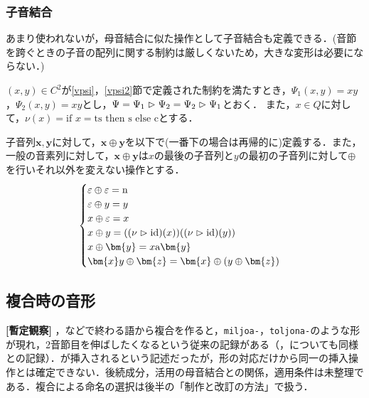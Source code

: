\documentclass[../../main-detail.tex]{subfiles}
\begin{document}
\subsubsection{子音結合}
あまり使われないが，母音結合に似た操作として子音結合も定義できる．(音節を跨ぐときの子音の配列に関する制約は厳しくないため，大きな変形は必要にならない．)
\begin{definition}
  $(x,y)\in C^2$が\ref{vpsi}，\ref{vpsi2}節で定義された制約を満たすとき，$\Psi_1(x,y)=xy$，$\Psi_2(x,y)=xy$とし，$\Psi = \Psi_1\vartriangleright \Psi_2 = \Psi_2\vartriangleright \Psi_1$とおく．%
  また，$x\in Q$に対して，$\nu(x)=\text{if }x=\text{ts}\text{ then }\text{s}\text{ else }\text{c}$とする．
\end{definition}
\begin{definition}
子音列$\bm{x},\bm{y}$に対して，$\bm{x}\oplus \bm{y}$を以下で(一番下の場合は再帰的に)定義する．また，一般の音素列に対して，$\bm{x}\oplus\bm{y}$は$x$の最後の子音列と$y$の最初の子音列に対して$\oplus$を行いそれ以外を変えない操作とする．
\[\begin{cases}
\varepsilon \oplus \varepsilon = \text{n}\\
\varepsilon \oplus y = y\\
x \oplus \varepsilon = x\\
x \oplus y = ((\nu \vlr \text{id})(x))((\nu \vlr \text{id})(y))\\
x \oplus \bm{y} = x\text{a}\bm{y}\\
\bm{x}y \oplus \bm{z} = \bm{x} \oplus (y \oplus \bm{z})\\
\end{cases}\]
\end{definition}

\subsection{複合時の音形}
\textbf{[暫定観察]} ，などで終わる語から複合を作ると，\texttt{miljoa-}，\texttt{toljona-}のような形が現れ，2音節目を伸ばしたくなるという従来の記録がある（，についても同様との記録）．が挿入されるという記述だったが，形の対応だけから同一の挿入操作とは確定できない．後続成分，活用の母音結合との関係，適用条件は未整理である．複合による命名の選択は後半の「制作と改訂の方法」で扱う．
\end{document}
